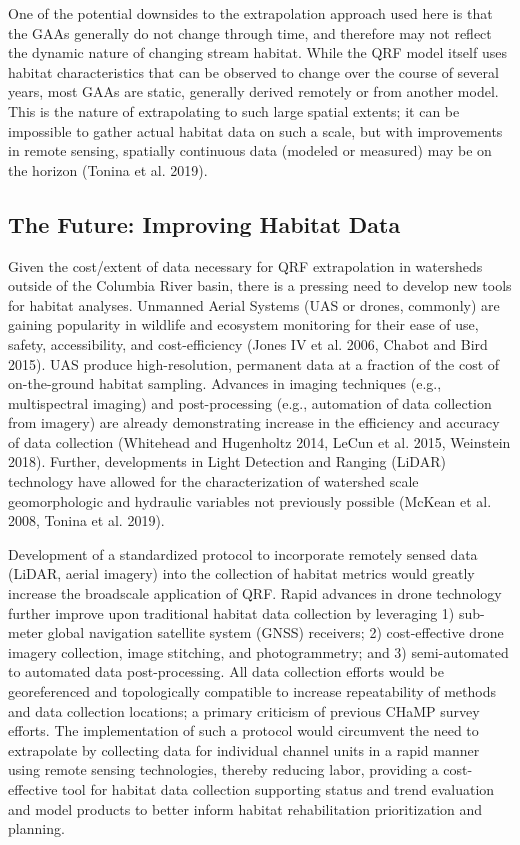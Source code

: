 \documentclass[
  12pt,
]{article}
\begin{document}
One of the potential downsides to the extrapolation approach used here is that the GAAs generally do not change through time, and therefore may not reflect the dynamic nature of changing stream habitat. While the QRF model itself uses habitat characteristics that can be observed to change over the course of several years, most GAAs are static, generally derived remotely or from another model. This is the nature of extrapolating to such large spatial extents; it can be impossible to gather actual habitat data on such a scale, but with improvements in remote sensing, spatially continuous data (modeled or measured) may be on the horizon (Tonina et al. 2019).

\hypertarget{the-future-improving-habitat-data}{%
\subsection{The Future: Improving Habitat Data}\label{the-future-improving-habitat-data}}

Given the cost/extent of data necessary for QRF extrapolation in watersheds outside of the Columbia River basin, there is a pressing need to develop new tools for habitat analyses. Unmanned Aerial Systems (UAS or drones, commonly) are gaining popularity in wildlife and ecosystem monitoring for their ease of use, safety, accessibility, and cost-efficiency (Jones IV et al. 2006, Chabot and Bird 2015). UAS produce high-resolution, permanent data at a fraction of the cost of on-the-ground habitat sampling. Advances in imaging techniques (e.g., multispectral imaging) and post-processing (e.g., automation of data collection from imagery) are already demonstrating increase in the efficiency and accuracy of data collection (Whitehead and Hugenholtz 2014, LeCun et al. 2015, Weinstein 2018). Further, developments in Light Detection and Ranging (LiDAR) technology have allowed for the characterization of watershed scale geomorphologic and hydraulic variables not previously possible (McKean et al. 2008, Tonina et al. 2019).

Development of a standardized protocol to incorporate remotely sensed data (LiDAR, aerial imagery) into the collection of habitat metrics would greatly increase the broadscale application of QRF. Rapid advances in drone technology further improve upon traditional habitat data collection by leveraging 1) sub-meter global navigation satellite system (GNSS) receivers; 2) cost-effective drone imagery collection, image stitching, and photogrammetry; and 3) semi-automated to automated data post-processing. All data collection efforts would be georeferenced and topologically compatible to increase repeatability of methods and data collection locations; a primary criticism of previous CHaMP survey efforts. The implementation of such a protocol would circumvent the need to extrapolate by collecting data for individual channel units in a rapid manner using remote sensing technologies, thereby reducing labor, providing a cost-effective tool for habitat data collection supporting status and trend evaluation and model products to better inform habitat rehabilitation prioritization and planning.
\end{document}
